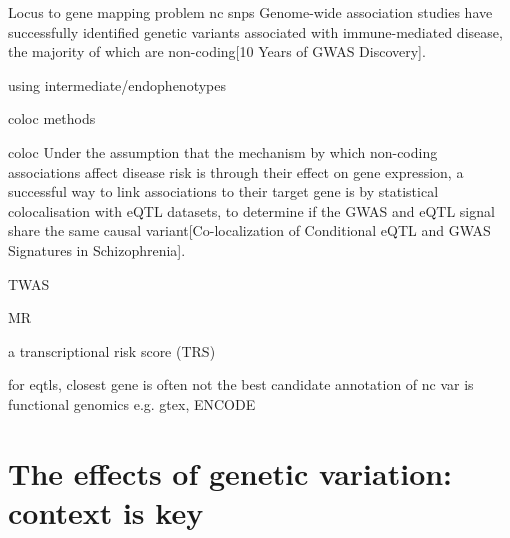 \begin{outline}

\1 Locus to gene mapping problem
    \2 nc snps
        \3 Genome-wide association studies have successfully identified genetic variants associated with immune-mediated disease, the majority of which are non-coding[10 Years of GWAS Discovery].

\1 using intermediate/endophenotypes

\1 coloc methods

    \2 coloc
        \3 Under the assumption that the mechanism by which non-coding associations affect disease risk is through their effect on gene expression, a successful way to link associations to their target gene is by statistical colocalisation with eQTL datasets, to determine if the GWAS and eQTL signal share the same causal variant[Co-localization of Conditional eQTL and GWAS Signatures in Schizophrenia].

    \2 TWAS

    \2 MR

    \2 a transcriptional risk score (TRS)

\1 for eqtls, closest gene is often not the best candidate
    \2 annotation of nc var is functional genomics
        \3 e.g. gtex, ENCODE
\end{outline}

\section{The effects of genetic variation: context is key}

